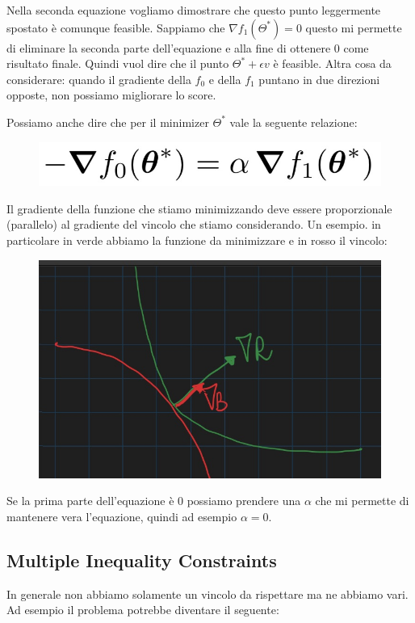 \documentclass[14pt]{extreport}
\begin{document}
Nella seconda equazione vogliamo dimostrare che questo punto leggermente spostato è comunque feasible. Sappiamo che $\nabla f_1(\Theta^*) = 0$ questo
mi permette di eliminare la seconda parte dell'equazione e alla fine di ottenere 0 come risultato finale. Quindi vuol dire che il punto $\Theta^* +
\epsilon v$ è feasible.\newline\newline
Altra cosa da considerare: quando il gradiente della $f_0$ e della $f_1$ puntano in due direzioni opposte, non possiamo migliorare lo score.

Possiamo anche dire che per il minimizer $\Theta^*$ vale la seguente relazione:
\begin{figure}[H]
\centering
\includegraphics[width=0.4\linewidth]{293.jpeg}
\end{figure}

Il gradiente della funzione che stiamo minimizzando deve essere proporzionale (parallelo) al gradiente del vincolo che stiamo considerando. Un
esempio. in particolare in verde abbiamo la funzione da minimizzare e in rosso il vincolo:

\begin{figure}[H]
\centering
\includegraphics[width=0.7\linewidth]{302.jpeg}
\end{figure}

Se la prima parte dell'equazione è 0 possiamo prendere una $\alpha$ che mi permette di mantenere vera l'equazione, quindi ad esempio $\alpha = 0$.

\subsection{Multiple Inequality Constraints}

In generale non abbiamo solamente un vincolo da rispettare ma ne abbiamo vari. Ad esempio il problema potrebbe diventare il seguente:
\end{document}
